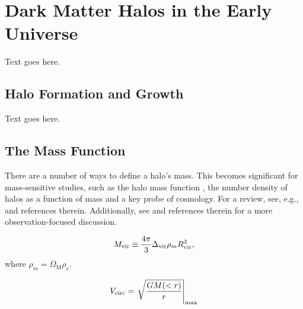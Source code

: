 
%
%

\section{Dark Matter Halos in the Early Universe}
\label{sec:early_universe}



Text goes here.




\subsection{Halo Formation and Growth}
\label{subsec:early_universe--formation_and_growth}


Text goes here.




\subsection{The Mass Function}
\label{subsec:early_universe--dark_matter_halos--mass}


There are a number of ways to define a halo's mass.  This becomes significant for mass-sensitive studies, such as the halo mass function \citep{1974ApJ...187..425P, 2007MNRAS.374....2R, 2006ApJ...642L..85H, 2007ApJ...671.1160L}, the number density of halos as a function of mass and a key probe of cosmology.  For a review, see, e.g., \citet{2001A&A...367...27W} and references therein.  Additionally, see \citet{2005RvMP...77..207V} and references therein for a more observation-focused discussion.

\begin{equation}
	{M_{\mathrm{vir}}} \equiv \frac{4 \pi}{3} \Delta_{{\mathrm{vir}}} \rho_{m} R^{3}_{{\mathrm{vir}}},
\end{equation}
where $\rho_{m} = \Omega_{\mathrm{M}} \rho_{c}$.

\begin{equation}
	{V_{\mathrm{circ}}} = \left. \sqrt{\frac{GM(<r)}{r}} \right|_{\mathrm{\max}}
\end{equation}




